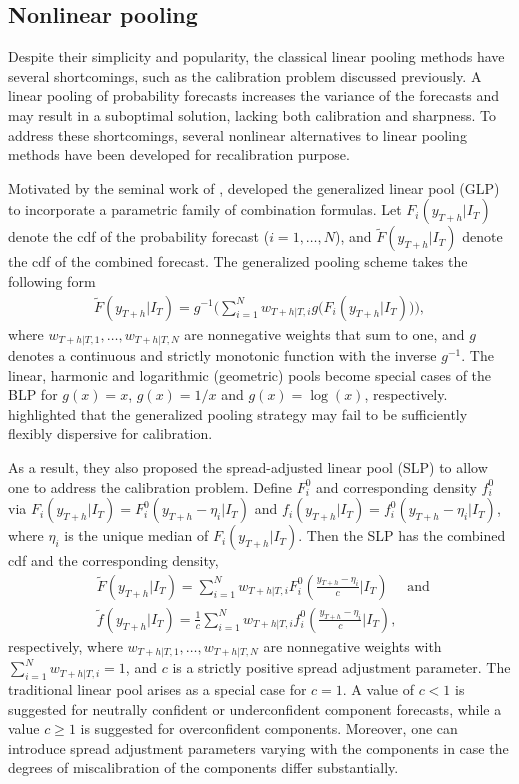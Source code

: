 \documentclass[a4paper,11pt]{article}
\begin{document}
\subsection{Nonlinear pooling}
\label{sec:nonlinear_pooling}

Despite their simplicity and popularity, the classical linear pooling methods have several shortcomings, such as the calibration problem discussed previously. A linear pooling of probability forecasts increases the variance of the forecasts and may result in a suboptimal solution, lacking both calibration and sharpness. To address these shortcomings, several nonlinear alternatives to linear pooling methods have been developed for recalibration purpose.

Motivated by the seminal work of \citet{Dawid1995-jj}, \citet{Gneiting2013-hl} developed the generalized linear pool (GLP) to incorporate a parametric family of combination formulas. Let $F_{i}(y_{T+h}|I_{T})$ denote the cdf of the probability forecast ($i=1,\dots,N$), and $\tilde{F}(y_{T+h}|I_{T})$ denote the cdf of the combined forecast. The generalized pooling scheme takes the following form
\begin{align*}
  \tilde{F}(y_{T+h}|I_{T}) = g^{-1}\bigg(\sum_{i=1}^{N} w_{T+h|T,i} g\big(F_{i}(y_{T+h}|I_{T})\big)\bigg),
\end{align*}
where $w_{T+h|T,1},\dots,w_{T+h|T,N}$ are nonnegative weights that sum to one, and $g$ denotes a continuous and strictly monotonic function with the inverse $g^{-1}$. The linear, harmonic and logarithmic (geometric) pools become special cases of the BLP for $g(x)=x$, $g(x)=1/x$ and $g(x)=\log(x)$, respectively. \citet{Gneiting2013-hl} highlighted that the generalized pooling strategy may fail to be sufficiently flexibly dispersive for calibration.

As a result, they also proposed the spread-adjusted linear pool (SLP) to allow one to address the calibration problem. Define $F_{i}^{0}$ and corresponding density $f_{i}^{0}$ via $F_{i}(y_{T+h}|I_{T})=F_{i}^{0}(y_{T+h}-\eta_{i}|I_{T})$ and $f_{i}(y_{T+h}|I_{T})=f_{i}^{0}(y_{T+h}-\eta_{i}|I_{T})$, where $\eta_{i}$ is the unique median of $F_{i}(y_{T+h}|I_{T})$. Then the SLP has the combined cdf and the corresponding density,
\begin{align*}
   & \tilde{F}(y_{T+h}|I_{T})=\sum_{i=1}^{N} w_{T+h|T,i} F_{i}^{0}\left(\frac{y_{T+h}-\eta_{i}}{c}\bigg|I_{T}\right) \quad \text { and } \\
   & \tilde{f}(y_{T+h}|I_{T})=\frac{1}{c} \sum_{i=1}^{N} w_{T+h|T,i} f_{i}^{0}\left(\frac{y_{T+h}-\eta_{i}}{c}\bigg|I_{T}\right),
\end{align*}
respectively, where $w_{T+h|T,1},\dots,w_{T+h|T,N}$ are nonnegative weights with $\sum_{i=1}^{N}w_{T+h|T,i}=1$, and $c$ is a strictly positive spread adjustment parameter. The traditional linear pool arises as a special case for $c = 1$. A value of $c < 1$ is suggested for neutrally confident or underconfident component forecasts, while a value $c \geq 1$ is suggested for overconfident components. Moreover, one can introduce spread adjustment parameters varying with the components in case the degrees of miscalibration of the components differ substantially.
\end{document}

